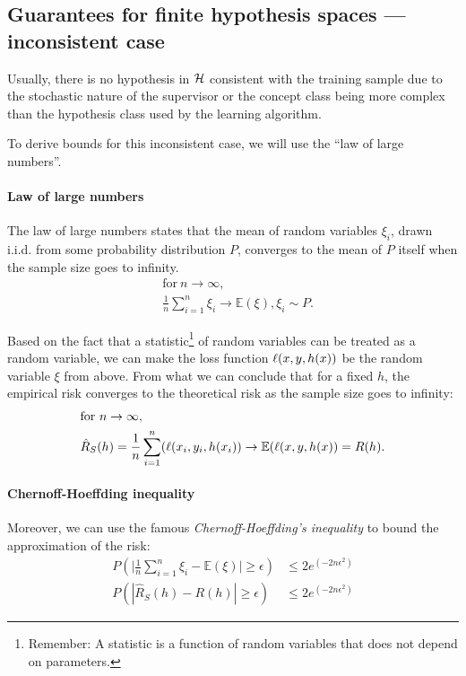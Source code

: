 \subsection{Guarantees for finite hypothesis spaces --- inconsistent case} Usually, there is no hypothesis in \(\mathcal{H}\) consistent with the training sample due to the stochastic nature of the supervisor or the concept class being more complex than the hypothesis class used by the learning algorithm.

To derive bounds for this inconsistent case, we will use the ``law of large numbers''.

\paragraph{Law of large numbers}\label{law_of_large_numbers} The law of large numbers states that the mean of random variables \(\xi_i\), drawn i.i.d. from some probability distribution \(P\), converges to the mean of \(P\) itself when the sample size goes to infinity.
\begin{align}
	&\text{for}~n \to \infty, \nonumber\\
	&\frac{1}{n} \sum_{i=1}^{n}\xi_i \to \mathbb{E}(\xi), \xi_i \sim P.
\end{align}

Based on the fact that a statistic\footnote{Remember: A statistic is a function of random variables that does not depend on parameters.} of random variables can be treated as a random variable, we can make the loss function \(\ell({x}, {y}, h({x}))\) be the random variable \(\xi\) from above. From what we can conclude that for a fixed \(h\), the empirical risk converges to the theoretical risk as the sample size goes to infinity:
\begin{align}
	&\text{for}~n \to \infty, \nonumber\\
	&\hat{R}_{S}(h) = \frac{1}{n} \sum_{i=1}^{n}(\ell({x}_i, {y}_i, h({x}_i)) \to \mathbb{E}(\ell(x, y, h({x}))=R(h).
\end{align}

\paragraph{Chernoff-Hoeffding inequality} Moreover, we can use the famous \emph{Chernoff-Hoeffding's inequality} to bound the approximation of the risk:
\begin{align}
	P \left(\Bigg | \frac{1}{n} \sum_{i=1}^{n}\xi_i - \mathbb{E}(\xi) \Bigg | \geq \epsilon \right) &\leq 2 e^{(-2n\epsilon^2)} \tag{Chernoff-Hoeffding's inequality}\\
	P(|\hat{R}_{S}(h) - R(h)| \geq \epsilon) &\leq 2 e^{(-2n\epsilon^2)}
\end{align}

